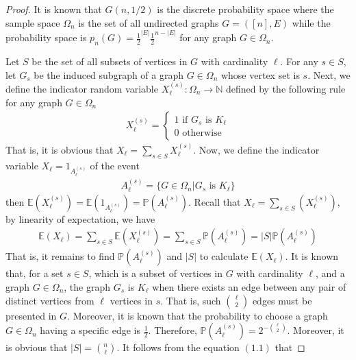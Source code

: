 \begin{proof}
  It is known that $G(n, 1/2)$ is the discrete probability space where the sample space $\Omega_{n}$ is the set of all undirected graphs  $G=([n],E)$ while the probability space is $p_{n}(G) = \frac{1}{2}^{|E|} \frac{1}{2}^{n - |E|}$ for any graph $G \in \Omega_{n}$. 

  Let $S$ be the set of all subsets of vertices in $G$ with cardinality $\ell$. For any $s \in S$, let $G_{s}$ be the induced subgraph of a graph $G \in \Omega_{n}$ whose vertex set is $s$. Next, we define the indicator random variable $X_{\ell}^{(s)} : \Omega_{n} \to \mathbb{N}$ defined by the following rule for any graph $G \in \Omega_{n}$
  \begin{align*}
    X_{\ell}^{(s)} = 
    \begin{cases}
      1 \text{ if $G_{s}$ is $K_{\ell}$} \\
      0 \text{ otherwise}
    \end{cases}
  \end{align*}
  That is, it is obvious that $X_{\ell} = \sum\limits_{s \in S} X_{\ell}^{(s)}$. Now, we define the indicator variable $X_{\ell} = 1_{A_{\ell}^{(s)}}$ of the event 
  \begin{align*}
    A_{\ell}^{(s)} = \{G \in \Omega_{n} | \text{$G_{s}$ is $K_{\ell}$}\}  
  \end{align*}
  then $\mathbb{E}(X_{\ell}^{(s)}) = \mathbb{E}(1_{A_{\ell}^{(s)}}) = \mathbb{P}(A_{\ell}^{(s)})$. Recall that $X_{\ell} = \sum\limits_{s \in S} (X_{\ell}^{(s)})$, by linearity of expectation, we have
  \begin{align*}
    \mathbb{E}(X_{\ell}) = \sum\limits_{s \in S} \mathbb{E}(X_{\ell}^{(s)}) = \sum\limits_{s \in S} \mathbb{P}(A_{\ell}^{(s)}) = |S| \mathbb{P}(A_{\ell}^{(s)}) \tag{1.1}
  \end{align*}
  That is, it remains to find $\mathbb{P}(A_{\ell}^{(s)})$ and $|S|$ to calculate $\mathbb{E}(X_{\ell})$. It is known that, for a set $s \in S$, which is a subset of vertices in $G$ with cardinality $\ell$, and a graph $G \in \Omega_{n}$, the graph $G_{s}$ is $K_{\ell}$ when there exists an edge between any pair of distinct vertices from $\ell$ vertices in $s$. That is, such $\binom{\ell}{2}$ edges must be presented in $G$. Moreover, it is known that the probability to choose a graph $G \in \Omega_{n}$ having a specific edge is $\frac{1}{2}$. Therefore, $\mathbb{P}(A_{\ell}^{(s)}) = 2^{-\binom{\ell}{2}}$. Moreover, it is obvious that $|S| = \binom{n}{\ell}$. It follows from the equation $(1.1)$ that 

\end{proof}
